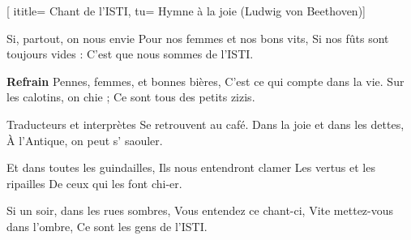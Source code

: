 [
ititle= {Chant de l'ISTI},
tu= {Hymne à la joie (Ludwig von Beethoven)}]

\beginverse
Si, partout, on nous envie
Pour nos femmes et nos bons vits,
Si nos fûts sont toujours vides :
C'est que nous sommes de l'ISTI.
\endverse

\beginchorus
\textbf {Refrain}
Pennes, femmes, et bonnes bières,
C'est ce qui compte dans la vie.
Sur les calotins, on chie ;
Ce sont tous des petits zizis.
\endchorus

\beginverse
Traducteurs et interprètes
Se retrouvent au café.
Dans la joie et dans les dettes,
À l'Antique, on peut s' saouler.
\endverse

\beginverse
Et dans toutes les guindailles,
Ils nous entendront clamer
Les vertus et les ripailles
De ceux qui les font chi-er.
\endverse

\beginverse
Si un soir, dans les rues sombres,
Vous entendez ce chant-ci,
Vite mettez-vous dans l'ombre,
Ce sont les gens de l'ISTI.
\endverse

\endsong
